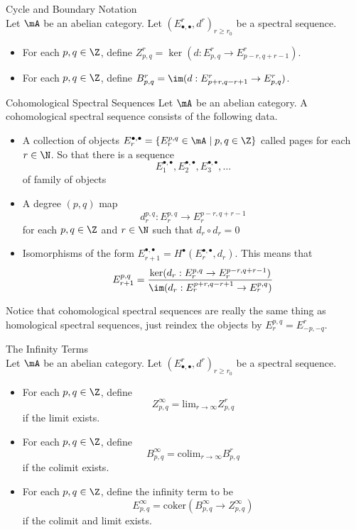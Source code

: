 \documentclass[a4paper]{article}
\begin{document}
\begin{defn}{Cycle and Boundary Notation}{}\\
Let $\mA$ be an abelian category. Let $(E_{\bullet,\bullet}^r,d^r)_{r\geq r_0}$ be a spectral sequence. 
\begin{itemize}
\item For each $p,q\in\Z$, define $Z_{p,q}^r=\ker(d:E_{p,q}^r\to 
E_{p-r,q+r-1}^r)$. 
\item For each $p,q\in\Z$, define $B_{p,q}^r=\im(d:E_{p+r,q-r+1}^r\to E_{p,q}^r)$. 
\end{itemize}
\end{defn}

\begin{defn}{Cohomological Spectral Sequences}{} Let $\mA$ be an abelian category. A cohomological spectral sequence consists of the following data.  
\begin{itemize}
\item A collection of objects $E_r^{\bullet,\bullet}=\{E_r^{p,q}\in\mA\;|\;p,q\in\Z\}$ called pages for each $r\in\N$. So that there is a sequence $$E_1^{\bullet,\bullet},E_2^{\bullet,\bullet},E_3^{\bullet,\bullet},\dots$$ of family of objects
\item A degree $(p,q)$ map $$d_r^{p,q}:E_r^{p,q}\to E_r^{p-r,q+r-1}$$ for each $p,q\in\Z$ and $r\in\N$ such that $d_r\circ d_r=0$
\item Isomorphisms of the form $E_{r+1}^{\bullet,\bullet}=H^\bullet(E_r^{\bullet,\bullet},d_r)$. This means that $$E_{r+1}^{p,q}=\frac{\ker(d_r:E_r^{p,q}\to E_r^{p-r,q+r-1})}{\im(d_r:E_r^{p+r,q-r+1}\to E_r^{p,q})}$$
\end{itemize}
\end{defn}

Notice that cohomological spectral sequences are really the same thing as homological spectral sequences, just reindex the objects by $E_r^{p,q}=E_{-p,-q}^r$. 

\begin{defn}{The Infinity Terms}{}\\
Let $\mA$ be an abelian category. Let $(E_{\bullet,\bullet}^r,d^r)_{r\geq r_0}$ be a spectral sequence. 
\begin{itemize}
\item For each $p,q\in\Z$, define $$Z_{p,q}^\infty=\text{lim}_{r\to\infty}Z_{p,q}^r$$ if the limit exists. 
\item For each $p,q\in\Z$, define $$B_{p,q}^\infty=\text{colim}_{r\to\infty}B_{p,q}^r$$ if the colimit exists. 
\item For each $p,q\in\Z$, define the infinity term to be $$E_{p,q}^\infty=\text{coker}(B_{p,q}^\infty\to Z_{p,q}^\infty)$$ if the colimit and limit exists. 
\end{itemize}
\end{defn}
\end{document}
